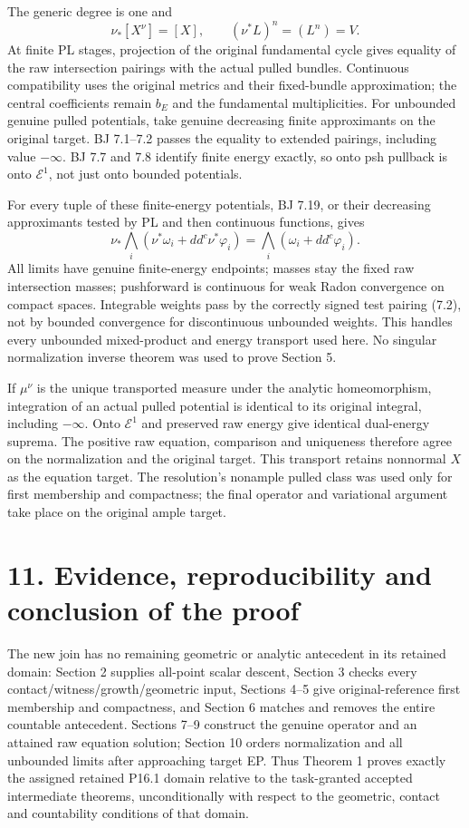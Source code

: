 \documentclass[
  10pt,
]{article}
\begin{document}
The generic degree is one and
\[\nu_*[X^\nu]=[X],\qquad (\nu^*L)^n=(L^n)=V.\] At finite PL stages,
projection of the original fundamental cycle gives equality of the raw
intersection pairings with the actual pulled bundles. Continuous
compatibility uses the original metrics and their fixed-bundle
approximation; the central coefficients remain \(b_E\) and the
fundamental multiplicities. For unbounded genuine pulled potentials,
take genuine decreasing finite approximants on the original target. BJ
7.1--7.2 passes the equality to extended pairings, including value
\(-\infty\). BJ 7.7 and 7.8 identify finite energy exactly, so onto psh
pullback is onto \(\mathcal E^1\), not just onto bounded potentials.

For every tuple of these finite-energy potentials, BJ 7.19, or their
decreasing approximants tested by PL and then continuous functions,
gives \[\nu_*\bigwedge_i(\nu^*\omega_i+dd^c\nu^*\varphi_i)
       =\bigwedge_i(\omega_i+dd^c\varphi_i).\] All limits have genuine
finite-energy endpoints; masses stay the fixed raw intersection masses;
pushforward is continuous for weak Radon convergence on compact spaces.
Integrable weights pass by the correctly signed test pairing (7.2), not
by bounded convergence for discontinuous unbounded weights. This handles
every unbounded mixed-product and energy transport used here. No
singular normalization inverse theorem was used to prove Section 5.

If \(\mu^\nu\) is the unique transported measure under the analytic
homeomorphism, integration of an actual pulled potential is identical to
its original integral, including \(-\infty\). Onto \(\mathcal E^1\) and
preserved raw energy give identical dual-energy suprema. The positive
raw equation, comparison and uniqueness therefore agree on the
normalization and the original target. This transport retains nonnormal
\(X\) as the equation target. The resolution's nonample pulled class was
used only for first membership and compactness; the final operator and
variational argument take place on the original ample target.

\section{11. Evidence, reproducibility and conclusion of the
proof}\label{evidence-reproducibility-and-conclusion-of-the-proof}

The new join has no remaining geometric or analytic antecedent in its
retained domain: Section 2 supplies all-point scalar descent, Section 3
checks every contact/witness/growth/geometric input, Sections 4--5 give
original-reference first membership and compactness, and Section 6
matches and removes the entire countable antecedent. Sections 7--9
construct the genuine operator and an attained raw equation solution;
Section 10 orders normalization and all unbounded limits after
approaching target EP. Thus Theorem 1 proves exactly the assigned
retained P16.1 domain relative to the task-granted accepted intermediate
theorems, unconditionally with respect to the geometric, contact and
countability conditions of that domain.
\end{document}
